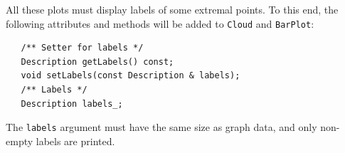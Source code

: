 All these plots must display labels of some extremal points.  To this end, the following attributes
and methods will be added to \texttt{Cloud} and \texttt{BarPlot}:
\begin{verbatim}
   /** Setter for labels */
   Description getLabels() const;
   void setLabels(const Description & labels);
   /** Labels */
   Description labels_;
\end{verbatim}
The \texttt{labels} argument must have the same size as graph data, and only non-empty labels are
printed.
